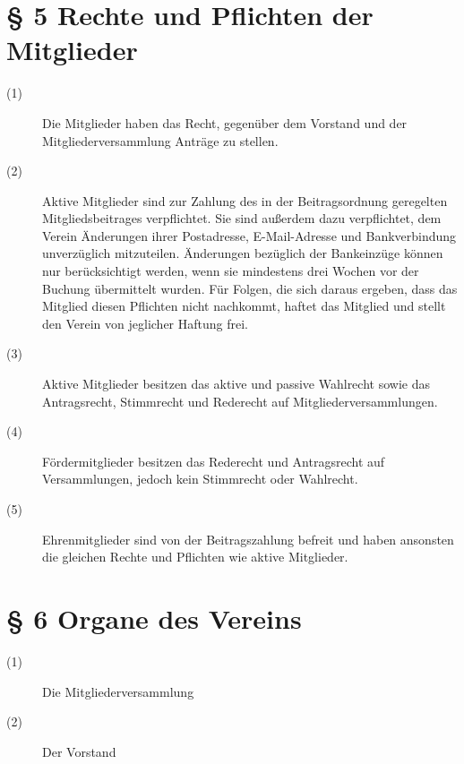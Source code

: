 \documentclass[a4paper,12pt]{scrartcl}
\begin{document}
\section*{\S{} 5 Rechte und Pflichten der Mitglieder}
\begin{description} 

\item[(1)] Die Mitglieder haben das Recht, gegenüber dem Vorstand und der Mitgliederversammlung Anträge zu stellen.
\item[(2)] Aktive Mitglieder sind zur Zahlung des in der Beitragsordnung geregelten Mitgliedsbeitrages verpflichtet. Sie sind außerdem dazu verpflichtet, dem Verein Änderungen ihrer Postadresse, E-Mail-Adresse und Bankverbindung unverzüglich mitzuteilen. Änderungen bezüglich der Bankeinzüge können nur berücksichtigt werden, wenn sie mindestens drei Wochen vor der Buchung übermittelt wurden. Für Folgen, die sich daraus ergeben, dass das Mitglied diesen Pflichten nicht nachkommt, haftet das Mitglied und stellt den Verein von jeglicher Haftung frei.
\item[(3)] Aktive Mitglieder besitzen das aktive und passive Wahlrecht sowie das Antragsrecht, Stimmrecht und Rederecht auf Mitgliederversammlungen.
\item[(4)] Fördermitglieder besitzen das Rederecht und Antragsrecht auf Versammlungen, jedoch kein Stimmrecht oder Wahlrecht.
\item[(5)] Ehrenmitglieder sind von der Beitragszahlung befreit und haben ansonsten die gleichen Rechte und Pflichten wie aktive Mitglieder.

\end{description}



\section*{\S{} 6 Organe des Vereins}
\begin{description} 

\item[(1)] Die Mitgliederversammlung
\item[(2)] Der Vorstand

\end{description}
\end{document}
